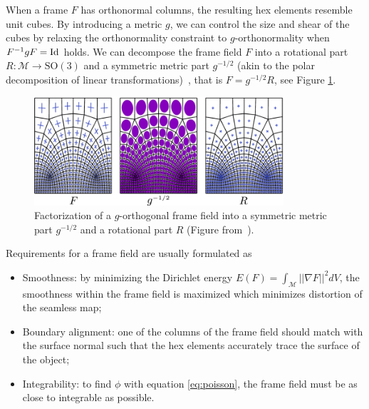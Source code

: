 \documentclass[../thesis.tex]{subfiles}
\begin{document}
When a frame $F$ has orthonormal columns, the resulting hex elements resemble unit cubes.
By introducing a metric $g$, we can control the size and shear of the cubes by
relaxing the orthonormality constraint to $g$-orthonormality when
$F^{-1}gF = \operatorname{Id}$
holds. We can decompose the frame field $F$ into a rotational part $R : \mathcal{M} \to \text{SO}(3)$ and a symmetric metric part $g^{-1/2}$
(akin to the polar decomposition of linear transformations)~\cite{Panozzo}, that is $F = g^{-1/2}R$,
see Figure \ref{fig:factorization}.
\begin{figure}[htb]
  \centering
  \includegraphics[width=25em]{figures/factorization}
  \caption{Factorization of a $g$-orthogonal frame field into a symmetric metric part $g^{-1/2}$ and a rotational part $R$
  (Figure from~\cite{Fang23}).}
  \label{fig:factorization}
\end{figure}
Requirements for a frame field are usually formulated as
\begin{itemize}
  \item Smoothness: by minimizing the Dirichlet energy $E(F)=\int_{\mathcal{M}}||\nabla F||^2 dV $, the smoothness within the frame field is maximized which minimizes distortion of the seamless map;
  \item Boundary alignment: one of the columns of the frame field should match with the surface normal such that the hex elements accurately trace the surface of the object;
  \item Integrability: to find $\phi$ with equation \ref{eq:poisson}, the frame field must be as close to integrable as possible.
\end{itemize}
\end{document}

